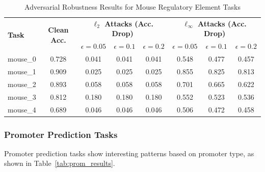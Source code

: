 \documentclass{article} %
\begin{document}
\begin{table}[h]
\centering
\caption{Adversarial Robustness Results for Mouse Regulatory Element Tasks}
\label{tab:mouse_results}
\begin{tabular}{lccccccc}
\toprule
\multirow{2}{*}{\textbf{Task}} & \multirow{2}{*}{\textbf{Clean Acc.}} & \multicolumn{3}{c}{\textbf{$\ell_2$ Attacks (Acc. Drop)}} & \multicolumn{3}{c}{\textbf{$\ell_\infty$ Attacks (Acc. Drop)}} \\
\cmidrule(lr){3-5} \cmidrule(lr){6-8}
& & $\epsilon=0.05$ & $\epsilon=0.1$ & $\epsilon=0.2$ & $\epsilon=0.05$ & $\epsilon=0.1$ & $\epsilon=0.2$ \\
\midrule
mouse\_0 & 0.728 & 0.041 & 0.041 & 0.041 & 0.548 & 0.477 & 0.457 \\
mouse\_1 & 0.909 & 0.025 & 0.025 & 0.025 & 0.855 & 0.825 & 0.813 \\
mouse\_2 & 0.893 & 0.058 & 0.058 & 0.058 & 0.701 & 0.665 & 0.622 \\
mouse\_3 & 0.812 & 0.180 & 0.180 & 0.180 & 0.552 & 0.523 & 0.536 \\
mouse\_4 & 0.689 & 0.046 & 0.046 & 0.046 & 0.506 & 0.472 & 0.458 \\
\bottomrule
\end{tabular}
\end{table}

\subsubsection{Promoter Prediction Tasks}

Promoter prediction tasks show interesting patterns based on promoter type, as shown in Table~\ref{tab:prom_results}.

\begin{table}[h]
\centering
\caption{Adversarial Robustness Results for Promoter Prediction Tasks}
\label{tab:prom_results}
\end{table}
\end{document}
